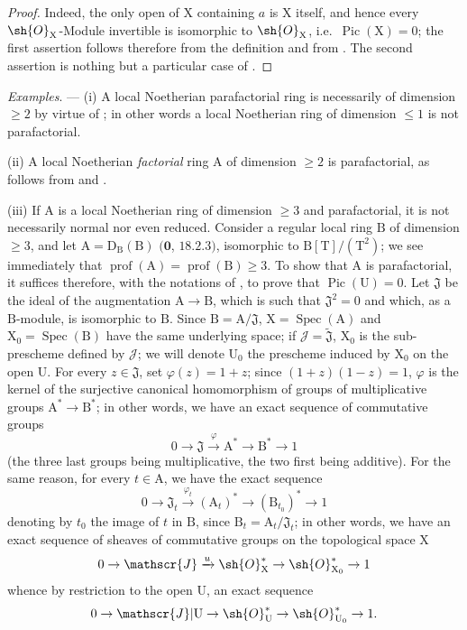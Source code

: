 \begin{proof}
Indeed, the only open of $\mathrm{X}$ containing $a$ is $\mathrm{X}$ itself, and hence every $\sh{O}_{\mathrm{X}}$-Module invertible is isomorphic to $\sh{O}_{\mathrm{X}}$, i.e.\ $\operatorname{Pic}(\mathrm{X})=0$; the first assertion follows therefore from the definition  and from .
The second assertion is nothing but a particular case of .
\end{proof}

\begin{env}[21.13.9]
\label{IV.21.13.9}
\emph{Examples}. ---
(i)
A local Noetherian parafactorial ring is necessarily of dimension $\geq 2$ by virtue of ; in other words a local Noetherian ring of dimension $\leq 1$ is not parafactorial.

(ii)
A local Noetherian \emph{factorial} ring $\mathrm{A}$ of dimension $\geq 2$ is parafactorial, as follows from  and .

(iii)
If $\mathrm{A}$ is a local Noetherian ring of dimension $\geq 3$ and parafactorial, it is not necessarily normal nor even reduced.
Consider a regular local ring $\mathrm{B}$ of dimension $\geq 3$, and let $\mathrm{A}=\mathrm{D}_{\mathrm{B}}(\mathrm{B})$ $(\mathbf{0}$, $18.2.3)$, isomorphic to $\mathrm{B}[\mathrm{T}]/(\mathrm{T}^2)$; we see immediately that $\operatorname{prof}(\mathrm{A})=\operatorname{prof}(\mathrm{B})\geq 3$.
To show that $\mathrm{A}$ is parafactorial, it suffices therefore, with the notations of , to prove that $\operatorname{Pic}(\mathrm{U})=0$.
Let $\mathfrak{J}$ be the ideal of the augmentation $\mathrm{A}\to\mathrm{B}$, which is such that $\mathfrak{J}^2=0$ and which, as a $\mathrm{B}$-module, is isomorphic to $\mathrm{B}$.
Since $\mathrm{B}=\mathrm{A}/\mathfrak{J}$, $\mathrm{X}=\operatorname{Spec}(\mathrm{A})$ and $\mathrm{X}_0=\operatorname{Spec}(\mathrm{B})$ have the same underlying space; if $\mathscr{J}=\widetilde{\mathfrak{J}}$, $\mathrm{X}_0$ is the sub-prescheme defined by $\mathscr{J}$; we will denote $\mathrm{U}_0$ the prescheme induced by $\mathrm{X}_0$ on the open $\mathrm{U}$.
For every $z\in\mathfrak{J}$, set $\varphi(z)=1+z$; since $(1+z)(1-z)=1$, $\varphi$ is the kernel of the surjective canonical homomorphism of groups of multiplicative groups $\mathrm{A}^*\to\mathrm{B}^*$; in other words, we have an exact sequence of commutative groups
\[
  0\to\mathfrak{J}\xrightarrow{\varphi}\mathrm{A}^*\to\mathrm{B}^*\to 1
\]
(the three last groups being multiplicative, the two first being additive).
For the same reason, for every $t\in\mathrm{A}$, we have the exact sequence
\[
  0\to\mathfrak{J}_t\xrightarrow{\varphi_t}(\mathrm{A}_t)^*\to(\mathrm{B}_{t_0})^*\to 1
\]
denoting by $t_0$ the image of $t$ in $\mathrm{B}$, since $\mathrm{B}_t=\mathrm{A}_t/\mathfrak{J}_t$; in other words, we have an exact sequence of sheaves of commutative groups on the topological space $\mathrm{X}$
\[
  0\to\mathscr{J}\xrightarrow{u}\sh{O}_{\mathrm{X}}^*\to\sh{O}_{\mathrm{X}_0}^*\to 1
\]
whence by restriction to the open $\mathrm{U}$, an exact sequence
\[
  0\to\mathscr{J}|\mathrm{U}\to\sh{O}_{\mathrm{U}}^*\to\sh{O}_{\mathrm{U}_0}^*\to 1.
\]


\end{env}
